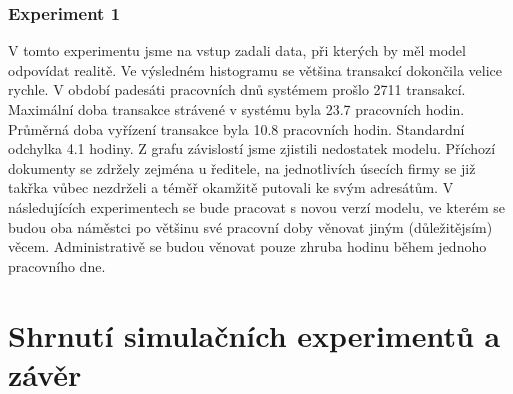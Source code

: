 \documentclass[12pt,a4paper]{article}
\begin{document}
\subsubsection{Experiment 1}
V tomto experimentu jsme na vstup zadali data, při kterých by měl model odpovídat realitě. Ve výsledném histogramu se většina transakcí dokončila velice rychle. V období padesáti pracovních dnů systémem prošlo 2711 transakcí. Maximální doba transakce strávené v systému byla 23.7 pracovních hodin. Průměrná doba vyřízení transakce byla 10.8 pracovních hodin. Standardní odchylka 4.1 hodiny. Z grafu závislostí jsme zjistili nedostatek modelu. Příchozí dokumenty se zdržely zejména u ředitele, na jednotlivích úsecích firmy se již takřka vůbec nezdrželi a téměř okamžitě putovali ke svým adresátům. V následujících experimentech se bude pracovat s novou verzí modelu, ve kterém se budou oba náměstci po většinu své pracovní doby věnovat jiným (důležitějsím) věcem. Administrativě se budou věnovat pouze zhruba hodinu během jednoho pracovního dne.
\newpage


\section{Shrnutí simulačních experimentů a závěr}


\newpage
\end{document}
